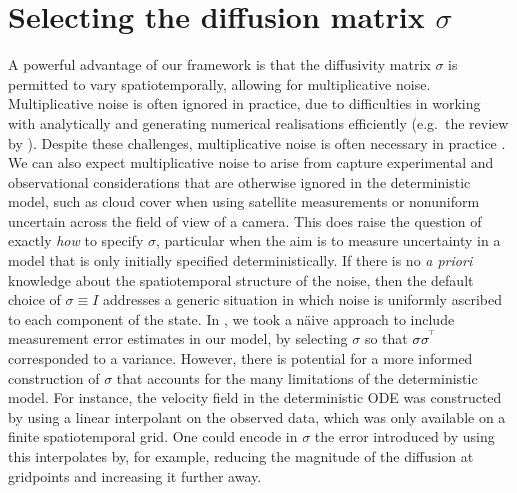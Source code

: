 \section{Selecting the diffusion matrix \(\sigma\)}
A powerful advantage of our framework is that the diffusivity matrix \(\sigma\) is permitted to vary spatiotemporally, allowing for multiplicative noise.
Multiplicative noise is often ignored in practice, due to difficulties in working with analytically \citep{SanchoEtAl_1982_AnalyticalNumericalStudies} and generating numerical realisations efficiently (e.g.\ the review by \cite{MoraEtAl_2017_StableNumericalScheme}).
Despite these challenges, multiplicative noise is often necessary in practice \citep[e.g.]{Sura_2003_StochasticAnalysisSouthern,KamenkovichEtAl_2015_PropertiesOriginsAnisotropic}.
We can also expect multiplicative noise to arise from capture experimental and observational considerations that are otherwise ignored in the deterministic model, such as cloud cover when using satellite measurements or nonuniform uncertain across the field of view of a camera.
This does raise the question of exactly \emph{how} to specify \(\sigma\), particular when the aim is to measure uncertainty in a model that is only initially specified deterministically.
If there is no \emph{a priori} knowledge about the spatiotemporal structure of the noise, then the default choice of \(\sigma \equiv I\) addresses a generic situation in which noise is uniformly ascribed to each component of the state.
In , we took a n\"aive approach to include measurement error estimates in our model, by selecting \(\sigma\) so that \(\sigma\sigma^{^{\!\top}}\) corresponded to a variance.
However, there is potential for a more informed construction of \(\sigma\) that accounts for the many limitations of the deterministic model.
For instance, the velocity field in the deterministic ODE was constructed by using a linear interpolant on the observed data, which was only available on a finite spatiotemporal grid.
One could encode in \(\sigma\) the error introduced by using this interpolates by, for example, reducing the magnitude of the diffusion at gridpoints and increasing it further away.
